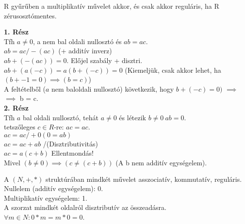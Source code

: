 \begin{frame}

\begin{tcolorbox}[title={Lemma: Nullosztó és regularitás}]
R gyűrűben a multiplikatív művelet akkor, és csak akkor reguláris, ha R zérusosztómentes.
\end{tcolorbox}

\begin{tcolorbox}[title={Bizonyítás}]
\textbf{1. Rész}\\
Tfh $a \neq 0$, a nem bal oldali nullosztó és $ab = ac$.\\
$ab = ac  / -(ac)$ (+ additív inverz)\\
$ab + (-(ac)) = 0$. Előjel szabály + disztri.\\
$ab + (a(-c)) = a(b+(-c)) = 0$ (Kiemeljük, csak akkor lehet, ha $(b + -1 = 0) \implies (b = c)$)\\
A feltételből ($a$ nem baloldali nullosztó) következik, hogy $b + (-c) = 0)$ $\implies$\\
$\implies$ b = c.\\
\bigskip
\textbf{2. Rész}\\
Tfh $a$ bal oldali nullosztó, tehát $a \neq 0$ és létezik $b \neq 0\: ab = 0$.\\
tetszőleges $c \in R$-re: $ac = ac$.\\
$ac = ac / +0 (0 = ab)$\\
$ac = ac + ab$ /(Disztributivitás)\\
$ac = a(c + b)$ Ellentmondás!\\
Mivel $(b \neq 0) \implies (c \neq (c + b))$ (A b nem additív egységelem).

\end{tcolorbox}

\end{frame}

\begin{frame}

\begin{tcolorbox}[title={Tétel: Természetes számok}]
A $(N, +, *)$ struktúrában mindkét művelet asszociatív, kommutatív, reguláris.\\
Nullelem (additív egységelem): 0.\\
Multiplikatív egységelem: 1.\\
A szorzat mindkét oldalról disztributív az összeadásra.\\
${\forall}m \in N : 0 * m = m * 0 = 0$.

\end{tcolorbox}

\end{frame}

